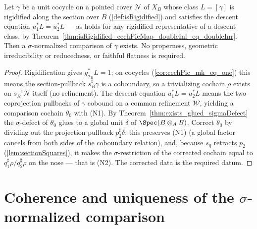 \begin{theorem}
  \label{thm:exists_normalizedCechComparison}
  \leanok
  Let \(\gamma\) be a unit cocycle on a pointed cover \(\mathcal N\) of \(X_B\) whose class \(L =
  [\gamma]\) is rigidified along the section over \(B\) (\ref{def:isRigidified}) and satisfies the
  descent equation \(u_1^{*} L = u_2^{*} L\) — as holds for any rigidified representative of a
  descent class, by Theorem~\ref{thm:isRigidified_cechPicMap_doubleInl_eq_doubleInr}. Then a
  \(\sigma\)-normalized comparison of \(\gamma\) exists. No properness, geometric
  irreducibility or reducedness, or faithful flatness is required.
\end{theorem}
\begin{proof}
  \leanok
  Rigidification gives \(g_{\sigma_B}^{*} L = 1\); on cocycles (\ref{cor:cechPic_mk_eq_one}) this
  means the section-pullback \(s_B^{\sharp}\gamma\) is a coboundary, so a trivializing cochain
  \(\rho\) exists on \(s_B^{-1}\mathcal N\) itself (no refinement). The descent equation
  \(u_1^{*} L = u_2^{*} L\) means the two coprojection pullbacks of \(\gamma\) cobound on a common
  refinement \(\mathcal W\), yielding a comparison cochain \(\theta_0\) with (N1). By
  Theorem~\ref{thm:exists_glued_sigmaDefect} the \(\sigma\)-defect of \(\theta_0\) glues to a
  global unit \(\delta\) of \(\Spec(B \otimes_A B)\). Correct \(\theta_0\) by dividing out the
  projection pullback \(p_2^{\sharp}\delta\): this preserves (N1) (a global factor cancels from
  both sides of the coboundary relation), and, because \(s_q\) retracts \(p_2\)
  (\ref{lem:sectionSquares}), it makes the \(\sigma\)-restriction of the corrected cochain equal
  to \(q_1^{\sharp}\rho / q_2^{\sharp}\rho\) on the nose — that is (N2). The corrected data is the
  required datum.
\end{proof}

\section{Coherence and uniqueness of the
  \texorpdfstring{\(\sigma\)}{sigma}-normalized comparison}
\label{sec:comparisonCoherence}

